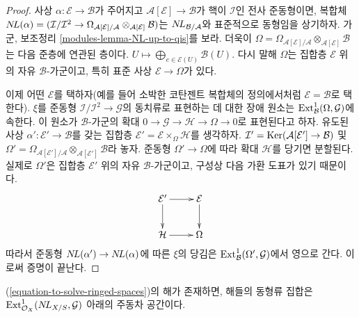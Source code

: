 \begin{proof}
사상 $\alpha : \mathcal{E} \to \mathcal{B}$가 주어지고
$\mathcal{A}[\mathcal{E}] \to \mathcal{B}$가 핵이 $\mathcal{I}$인
전사 준동형이면, 복합체
$\mathop{N\!L}\nolimits(\alpha) = (\mathcal{I}/\mathcal{I}^2 \to 
\Omega_{\mathcal{A}[\mathcal{E}]/\mathcal{A}}
\otimes_{\mathcal{A}[\mathcal{E}]} \mathcal{B})$는
$\mathop{N\!L}\nolimits_{\mathcal{B}/\mathcal{A}}$와 표준적으로 동형임을 상기하자.
가군, 보조정리 \ref{modules-lemma-NL-up-to-qis}를 보라. 더욱이
$\Omega = \Omega_{\mathcal{A}[\mathcal{E}]/\mathcal{A}}
\otimes_{\mathcal{A}[\mathcal{E}]} \mathcal{B}$는 다음 준층에 연관된
층이다.
$U \mapsto \bigoplus_{e \in \mathcal{E}(U)} \mathcal{B}(U)$.
다시 말해 $\Omega$는 집합층 $\mathcal{E}$ 위의 자유
$\mathcal{B}$-가군이고, 특히 표준 사상 $\mathcal{E} \to \Omega$가
있다.

\medskip\noindent
이제 어떤 $\mathcal{E}$를 택하자(예를 들어 소박한 코탄젠트 복합체의
정의에서처럼 $\mathcal{E} = \mathcal{B}$로 택한다). $\xi$를
준동형 $\mathcal{I}/\mathcal{I}^2 \to \mathcal{G}$의 동치류로
표현하는 데 대한 장애 원소는
$\mathop{\mathrm{Ext}}\nolimits^1_\mathcal{B}(\Omega, \mathcal{G})$에 속한다. 이 원소가
$\mathcal{B}$-가군의 확대
$0 \to \mathcal{G} \to \mathcal{H} \to \Omega \to 0$로 표현된다고
하자. 유도된 사상 $\alpha' : \mathcal{E}' \to \mathcal{B}$를 갖는
집합층 $\mathcal{E}' = \mathcal{E} \times_\Omega \mathcal{H}$를
생각하자. $\mathcal{I}' =
\mathop{\mathrm{Ker}}(\mathcal{A}[\mathcal{E}'] \to \mathcal{B})$ 및
$\Omega' = \Omega_{\mathcal{A}[\mathcal{E}']/\mathcal{A}}
\otimes_{\mathcal{A}[\mathcal{E}']} \mathcal{B}$라 놓자.
준동형 $\Omega' \to \Omega$에 따라 확대 $\mathcal{H}$를 당기면
분할된다. 실제로 $\Omega'$은 집합층 $\mathcal{E}'$ 위의 자유
$\mathcal{B}$-가군이고, 구성상 다음 가환 도표가 있기 때문이다.
$$
\xymatrix{
\mathcal{E}' \ar[r] \ar[d] & \mathcal{E} \ar[d] \\
\mathcal{H} \ar[r] & \Omega
}
$$
따라서 준동형 $\mathop{N\!L}\nolimits(\alpha') \to \mathop{N\!L}\nolimits(\alpha)$에 따른 $\xi$의 당김은
$\mathop{\mathrm{Ext}}\nolimits^1_\mathcal{B}(\Omega', \mathcal{G})$에서 영으로 간다. 이로써
증명이 끝난다.
\end{proof}

\begin{lemma}
\label{lemma-choices-ringed-spaces}
(\ref{equation-to-solve-ringed-spaces})의 해가 존재하면, 해들의 동형류
집합은 $\mathop{\mathrm{Ext}}\nolimits^1_{\mathcal{O}_X}(\mathop{N\!L}\nolimits_{X/S}, \mathcal{G})$ 아래의
주동차 공간이다.
\end{lemma}

